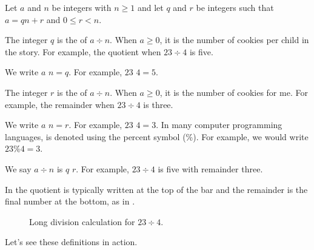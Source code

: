 \begin{defn}
\label{defn_quo_rem_div_mod}

Let $a$ and $n$ be integers with $n \ge 1$ and let $q$ and $r$ be integers such that $a = qn+r$ and $0 \le r < n$.
\begin{apart}
    \item The integer $q$ is the  of $a \div n$. When $a \ge 0$, it is the number of cookies per child in the story. For example, the quotient when $23 \div 4$ is five.  
    \item We write $a$  $n =q$.  For example,  $23$  $4=5$.  
    \item The integer $r$ is the  of $a \div n$.  When $a \ge 0$, it is the number of cookies for me.  For example, the remainder when $23 \div 4$ is three.  
    \item We write $a$  $n=r$.  For example, $23$  $4=3$. In many computer programming languages,  is denoted using the percent symbol (\%).  For example, we would write $23 \% 4 = 3.$
    \item We say $a \div n$ is $q$  $r$. For example, $23 \div 4$ is five with remainder three.
    \item In  the quotient is typically written at the top of the bar and the remainder is the final number at the bottom, as in .
       \begin{figure}[hbtp]
           \centering
           \caption{Long division calculation for $23 \div 4$.}
           \label{fig_longdivision_23div4}
       \end{figure}
    \end{apart}
\end{defn}

Let's see these definitions in action.

